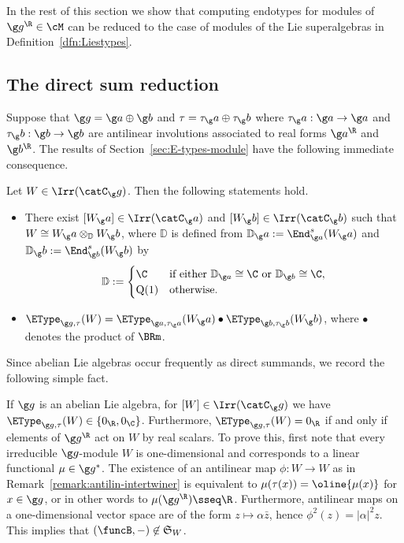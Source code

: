 \documentclass[12pt]{amsart}
\begin{document}
In the rest of this section we  show that  computing endotypes for modules of  $\g g^\R\in\cM$ can be reduced to the case of modules of the Lie superalgebras in Definition~\ref{dfn:Liestypes}.




\subsection{The direct sum reduction}
Suppose that $\g g=\g a\oplus\g b$ and $\tau=\tau_\g a\oplus \tau_\g b$ where $\tau_\g a:\g a\to \g a$ and $\tau_\g b:\g b\to \g b$ are antilinear involutions associated to real forms $\g a^\R$ and $\g b^\R$. 
The results of Section~\ref{sec:E-types-module} have the following immediate consequence. 
\begin{thm}
\label{thm:DirectSum}
Let $W\in\Irr(\catC_\g g)$. Then the following statements hold.
\begin{itemize}
\item[\rm(i)] There exist $[W_\g a]\in\Irr(\catC_\g a)$ and  $[W_\g b]\in\Irr(\catC_\g b)$ such that $W\cong W_\g a\otimes_\mathbb D W_\g b$, where $\mathbb D$ is defined from $\mathbb D_\g a:=\End^s_{\g a}(W_\g a)$ and  
$\mathbb D_\g b:=\End^s_{\g b}(W_\g b)$ by
\begin{equation}
\label{eq:DWAWB=}
\mathbb D:=\begin{cases}
\C& \text{if either $\mathbb D_{\g a}\cong \C$ or $\mathbb D_{\g b}\cong \C$},\\
\mathrm{Q}(1)& \text{otherwise}.
\end{cases}
\end{equation}
\item[\rm (ii)] $\EType_{\g g,\tau}(W)=\EType_{\g a,\tau_\g a}(W_\g a)\bullet \EType_{\g b,\tau_\g b}(W_\g b)$, where $\bullet$ denotes the product of $\BRm$. 
\end{itemize}
\end{thm}
Since abelian Lie algebras occur frequently as direct summands, we record the following simple fact. 
\begin{rmk}
\label{rmk-abbel}
If $\g g$ is an abelian Lie algebra, for $[W]\in\Irr(\catC_\g g)$ we have $\EType_{\g g,\tau}(W)\in\{0_\R,0_\C\}$. Furthermore,  
$\EType_{\g g,\tau}(W)=0_\R$
if and only if  elements of $\g g^\R$ act on $W$ by real scalars. To prove this, first note that every irreducible $\g g$-module $W$ is one-dimensional and corresponds to a linear functional $\mu\in\g g^*$. The existence of an antilinear map $\phi:W\to W$  as in Remark~\ref{remark:antilin-intertwiner} is equivalent to $\mu(\tau(x))=\oline{\mu(x)}$ for $x\in\g g$, or in other words to $\mu(\g g^\R)\sseq \R$. Furthermore, antilinear maps on a one-dimensional vector space are of the form $z\mapsto \alpha \bar z$, hence $\phi^2(z)=|\alpha|^2z$. This implies that $(\funcB,-)\not\in\mathfrak S_W$. 
\end{rmk}
\end{document}
